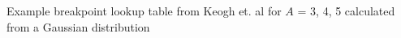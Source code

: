 Example breakpoint lookup table from Keogh et. al \cite{Keogh:2005wd} for $A$ = 3, 4, 5 calculated from a Gaussian distribution 
\label{fig:SAXBreakpoints}